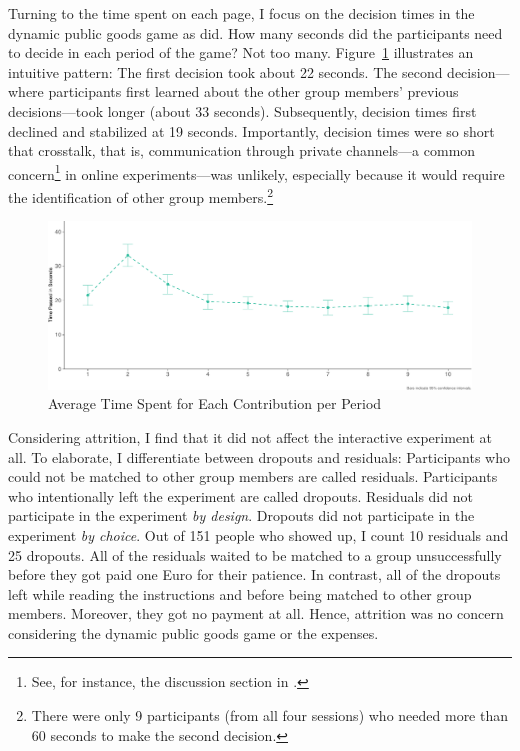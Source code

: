 \documentclass[
  authoryear,
  review,
  3p,
  onecolumn]{elsarticle}
\begin{document}
Turning to the time spent on each page, I focus on the decision times in
the dynamic public goods game as \citet{Anderhub2001} did. How many
seconds did the participants need to decide in each period of the game?
Not too many. Figure~\ref{fig-time-spent} illustrates an intuitive
pattern: The first decision took about 22 seconds. The second
decision---where participants first learned about the other group
members' previous decisions---took longer (about 33 seconds).
Subsequently, decision times first declined and stabilized at 19
seconds. Importantly, decision times were so short that crosstalk, that
is, communication through private channels---a common concern\footnote{See,
  for instance, the discussion section in \citet[p.~119]{AGM2018}.} in
online experiments---was unlikely, especially because it would require
the identification of other group members.\footnote{There were only 9
  participants (from all four sessions) who needed more than 60 seconds
  to make the second decision.}

\begin{figure}

{\centering \includegraphics{paper_files/figure-pdf/fig-time-spent-1.pdf}

}

\caption{\label{fig-time-spent}Average Time Spent for Each Contribution
per Period}

\end{figure}

Considering attrition, I find that it did not affect the interactive
experiment at all. To elaborate, I differentiate between dropouts and
residuals: Participants who could not be matched to other group members
are called residuals. Participants who intentionally left the experiment
are called dropouts. Residuals did not participate in the experiment
\emph{by design}. Dropouts did not participate in the experiment
\emph{by choice}. Out of 151 people who showed up, I count 10 residuals
and 25 dropouts. All of the residuals waited to be matched to a group
unsuccessfully before they got paid one Euro for their patience. In
contrast, all of the dropouts left while reading the instructions and
before being matched to other group members. Moreover, they got no
payment at all. Hence, attrition was no concern considering the dynamic
public goods game or the expenses.
\end{document}
